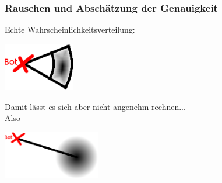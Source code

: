 \frame
{\frametitle{Rauschen und Abschätzung der Genauigkeit}
Echte Wahrscheinlichkeitsverteilung:
\begin{center}\includegraphics[height=2.1cm, center]{MPGI3-RC-13S_Wahrscheinlichkeit1.png}\end{center}
Damit lässt es sich aber nicht angenehm rechnen... \\
Also 
\begin{center}\includegraphics[height=2.1cm, center]{MPGI3-RC-13S_Wahrscheinlichkeit2.png}\end{center}
}